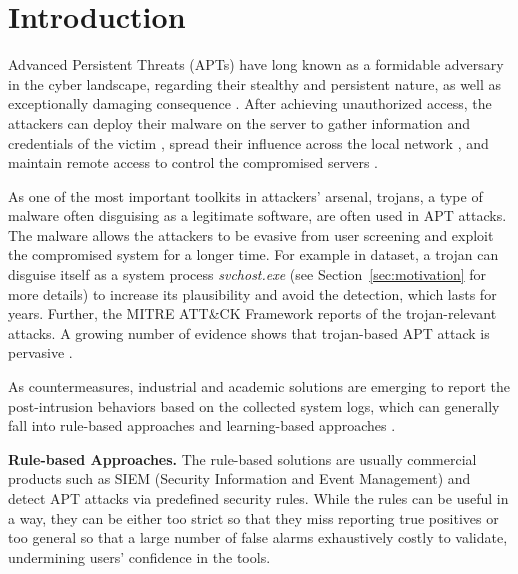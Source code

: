 \section{Introduction}
Advanced Persistent Threats (APTs) have long known as a formidable adversary in the cyber landscape,
regarding their stealthy and persistent nature, 
as well as exceptionally damaging consequence \cite{xx, xx, xx, xx, xx}.
After achieving unauthorized access, 
the attackers can deploy their malware on the server to 
gather information and credentials of the victim \cite{xx, xx},
spread their influence across the local network \cite{xx, xx}, and
maintain remote access to control the compromised servers \cite{xx, xx}.

As one of the most important toolkits in attackers' arsenal,
trojans, a type of malware often disguising as a legitimate software,  
are often used in APT attacks.
The malware allows the attackers to 
be evasive from user screening and
exploit the compromised system for a longer time.
For example in \hangsheng{} dataset, 
a trojan can disguise itself as a system process \textit{svchost.exe} (see Section~\ref{sec:motivation} for more details)
to increase its plausibility and avoid the detection,
which lasts for  years.
Further, the MITRE ATT\&CK Framework reports \hangsheng{} of the trojan-relevant attacks.
A growing number of evidence shows that trojan-based APT attack is 
pervasive \cite{valeros2020growth, xx}. 


As countermeasures, industrial and academic solutions \cite{karantzas2021empirical, cheng2023kairos,alsaheel2021atlas,han2020unicorn,inam2022sok,han2021sigl} are emerging to
report the post-intrusion behaviors based on the collected system logs,
which can generally fall into rule-based approaches \cite{milajerdi2019holmes,milajerdi2019poirot,hossain2020combating} and learning-based approaches \cite{liu2018towards,hassan2019nodoze,hassan2020we, wang2022threatrace,han2020unicorn,wang2020you}. 

\noindent\textbf{Rule-based Approaches.}
The rule-based solutions are usually commercial products \cite{milajerdi2019holmes,milajerdi2019poirot,hossain2020combating} such as SIEM (Security Information and Event Management) and  detect APT attacks via predefined security rules.
While the rules can be useful in a way,
they can be either too strict so that they miss reporting true positives or
too general so that a large number of false alarms exhaustively costly to validate,
undermining users' confidence in the tools.

